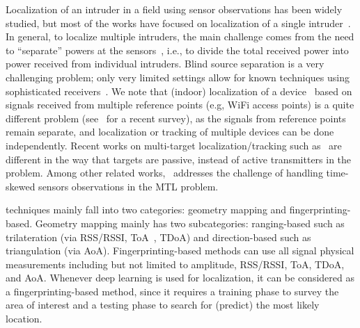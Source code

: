  Localization of an intruder in a field using sensor observations has been widely studied, but most of the works have focused on
localization of a single intruder~\cite{arani2018,dutta2016see}.
In general, to localize multiple intruders, the main challenge comes
from the need to ``separate'' powers at the sensors~\cite{mobicom-30},
i.e., to divide the total received power into power received from
individual intruders. Blind source separation is a very challenging
problem; only very limited settings allow for known
techniques using sophisticated receivers~\cite{freq-sig,ben-zhao}.
We note that (indoor) localization of a
  device~\cite{infocom00-radar} based on signals received from multiple reference points (e.g, WiFi access
  points) is a quite different problem
  (see~\cite{zafari-19} for a recent survey), as the signals from
  reference points remain separate, and localization or tracking of multiple
  devices can be done independently.
  Recent works on multi-target localization/tracking such as~\cite{ipsn19-multipassive} are different in the way that targets are passive, instead of active transmitters in the \mtl problem.
Among other related works,~\cite{multi-tx-dyspan-19} addresses the challenge of handling time-skewed sensors observations in the MTL problem.

 techniques mainly fall into two categories: geometry mapping and fingerprinting-based.
Geometry mapping mainly has two subcategories: ranging-based such as trilateration (via RSS/RSSI, ToA~\cite{zongxing2022tracking}, TDoA) and direction-based such as triangulation (via AoA).
Fingerprinting-based methods can use all signal physical measurements including but not limited to amplitude, RSS/RSSI, ToA, TDoA, and AoA.
Whenever deep learning is used for localization, it can be considered as a fingerprinting-based method, since it requires a 
training phase to survey the area of interest and a testing phase to search for (predict) the most likely location.

